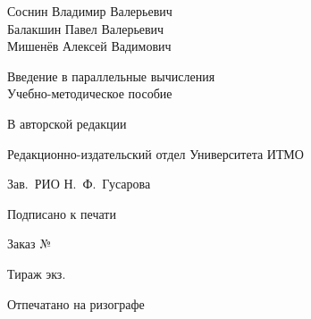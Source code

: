 \thispagestyle{empty}

\vspace*{\fill}

\begin{center}
    Соснин Владимир Валерьевич \\
    Балакшин Павел Валерьевич \\
    Мишенёв Алексей Вадимович 
\\[2\baselineskip]
\begin{bfseries}
    {\large Введение в параллельные вычисления}
    \\[\baselineskip]
    Учебно-методическое пособие
\end{bfseries}

\end{center}

\vspace*{\fill}

\noindent
В авторской редакции

\noindent
Редакционно-издательский отдел Университета ИТМО

\noindent
Зав.\ РИО \hfill Н.\ Ф.\ Гусарова

\noindent
Подписано к печати

\noindent
Заказ №

\noindent
Тираж \qquad \quad экз.

\noindent
Отпечатано на ризографе